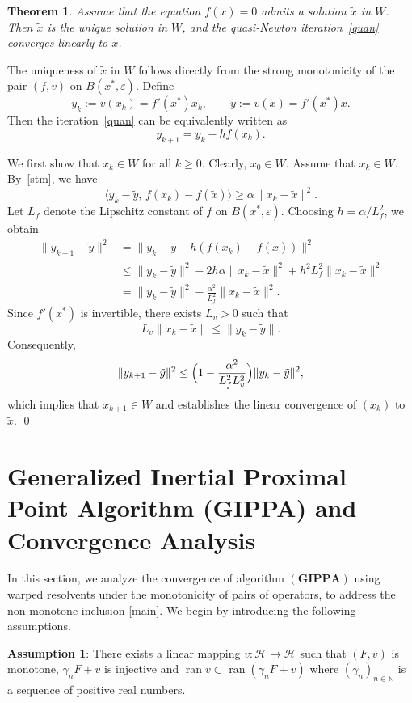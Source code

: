 \documentclass[11pt]{article}
\makeatletter
\renewenvironment{proof}[1][\proofname]{\par
	\normalfont
	\topsep0\p@\@plus3\p@ \trivlist
	\item[\hskip\labelsep\itshape
	#1\@addpunct{.}]\ignorespaces
}{%
	\qed\endtrivlist
}
\newtheorem{theorem}{Theorem}[section]
\theoremstyle{definition}
\theoremstyle{definition}
\theoremstyle{definition}
\newcommand{\ran}{\ensuremath{\operatorname{ran}}}
\makeatother
\begin{document}
\begin{theorem}\label{thm310}
Assume that the equation \(f(x)=0\) admits a solution \(\tilde{x}\) in \(W\).
Then \(\tilde{x}\) is the unique solution in \(W\), and the quasi-Newton iteration~\eqref{quan}
converges linearly to \(\tilde{x}\).
\end{theorem}

\begin{proof}
The uniqueness of \(\tilde{x}\) in \(W\) follows directly from the strong monotonicity of the pair \((f,v)\) on \(B(x^*,\varepsilon)\).
Define
\[
y_k := v(x_k)=f'(x^*)x_k,
\qquad
\tilde{y} := v(\tilde{x})=f'(x^*)\tilde{x}.
\]
Then the iteration~\eqref{quan} can be equivalently written as
\[
y_{k+1}=y_k-hf(x_k).
\]

We first show that \(x_k\in W\) for all \(k\ge0\).
Clearly, \(x_0\in W\).
Assume that \(x_k\in W\).
By~\eqref{stm}, we have
\[
\langle y_k-\tilde{y},\, f(x_k)-f(\tilde{x}) \rangle
\ge \alpha\|x_k-\tilde{x}\|^2.
\]
Let \(L_f\) denote the Lipschitz constant of \(f\) on \(B(x^*,\varepsilon)\).
Choosing \(h=\alpha/L_f^2\), we obtain
\begin{align*}
\|y_{k+1}-\tilde{y}\|^2
&= \|y_k-\tilde{y}-h(f(x_k)-f(\tilde{x}))\|^2 \\
&\le \|y_k-\tilde{y}\|^2
-2h\alpha\|x_k-\tilde{x}\|^2
+h^2L_f^2\|x_k-\tilde{x}\|^2 \\
&= \|y_k-\tilde{y}\|^2
-\frac{\alpha^2}{L_f^2}\|x_k-\tilde{x}\|^2.
\end{align*}
Since \(f'(x^*)\) is invertible, there exists \(L_v>0\) such that
\[
{L_v}\|x_k-\tilde{x}\|\le \|y_k-\tilde{y}\|.
\]
Consequently,
\[
\|y_{k+1}-\tilde{y}\|^2
\le\Bigl(1-\frac{\alpha^2}{L_f^2L_v^2}\Bigr)\|y_k-\tilde{y}\|^2,
\]
which implies that \(x_{k+1}\in W\) and establishes the linear convergence of \((x_k)\) to \(\tilde{x}\).
\end{proof}

\section{Generalized Inertial Proximal Point Algorithm (GIPPA) and  Convergence Analysis}\label{sec4}

In this section, we analyze the convergence of algorithm $(\mathbf{GIPPA})$ using warped resolvents under the monotonicity of pairs of operators, to address the non-monotone inclusion \eqref{main}. We begin by introducing the following assumptions.

\noindent \textbf{Assumption 1}: There exists a linear mapping \( v: \mathcal{H} \to \mathcal{H} \) such that \( (F, v) \) is monotone,  $\gamma_n F + v$ is injective and \( \ran v \subset \ran (\gamma_n F + v) \) where $(\gamma_n)_{n\in \mathbb{N}}$ is a sequence of positive real numbers.
\end{document}

